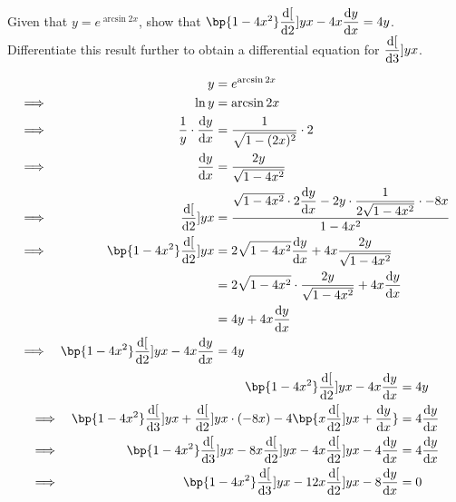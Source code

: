 \documentclass{echw}
\begin{document}
    \problem{}
        Given that $y = e^{\arcsin{2x}}$, show that $\bp{1-4x^2}\der[2]{y}{x} - 4x\der{y}{x} = 4y$. Differentiate this result further to obtain a differential equation for $\dfrac{\mathrm{d} [}{\mathrm{d} 3}]{y}{x}$.

    \solution
        \begin{alignat*}{2}
            &&y &= e^{\arcsin{2x}}\\
            \implies&& \ln y &= \arcsin{2x}\\
            \implies&& \dfrac1y \cdot \der{y}{x} &= \dfrac{1}{\sqrt{1 - (2x)^2}} \cdot 2\\
            \implies&& \der{y}{x} &= \dfrac{2y}{\sqrt{1 - 4x^2}}\\
            \implies&& \der[2]{y}{x} &= \dfrac{\sqrt{1 - 4x^2} \cdot 2\der{y}{x} - 2y \cdot \dfrac{1}{2\sqrt{1-4x^2}} \cdot -8x}{1-4x^2}\\
            \implies&& \bp{1-4x^2}\der[2]{y}{x} &= 2\sqrt{1 - 4x^2} \der{y}{x} + 4x \dfrac{2y}{\sqrt{1-4x^2}}\\
            && &= 2\sqrt{1 - 4x^2} \cdot \dfrac{2y}{\sqrt{1 - 4x^2}} + 4x \der{y}{x} \\
            && &= 4y + 4x \der{y}{x} \\
            \implies&& \bp{1-4x^2}\der[2]{y}{x} -4x \der{y}{x} &= 4y
        \end{alignat*}
        \begin{alignat*}{2}
            && \bp{1-4x^2}\der[2]{y}{x} -4x \der{y}{x} &= 4y\\
            \implies&&\bp{1 - 4x^2} \der[3]{y}{x} + \der[2]{y}{x} \cdot (-8x) - 4\bp{x  \der[2]{y}{x} + \der{y}{x} } &= 4\der{y}{x}\\
            \implies&&\bp{1 - 4x^2} \der[3]{y}{x} -8x \der[2]{y}{x} - 4x  \der[2]{y}{x} - 4\der{y}{x} &= 4\der{y}{x}\\
            \implies&&\bp{1 - 4x^2} \der[3]{y}{x} -12x \der[2]{y}{x} - 8\der{y}{x} &= 0
        \end{alignat*}

\end{document}
